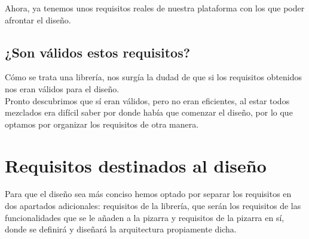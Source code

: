 Ahora, ya tenemos unos requisitos reales de nuestra plataforma con los que poder afrontar el diseño.

\subsection{¿Son válidos estos requisitos?}

Cómo se trata una librería, nos surgía la dudad de que si los requisitos obtenidos nos eran válidos para el diseño.\\

Pronto descubrimos que sí eran válidos, pero no eran eficientes, al estar todos mezclados era difícil saber por donde había que comenzar el diseño, por lo que optamos por organizar los requisitos de otra manera.

\section{Requisitos destinados al diseño}

Para que el diseño sea más conciso hemos optado por separar los requisitos en dos apartados adicionales: requisitos de la librería, que serán los requisitos de las funcionalidades que se le añaden a la pizarra y requisitos de la pizarra en sí, donde se definirá y diseñará la arquitectura propiamente dicha. 

